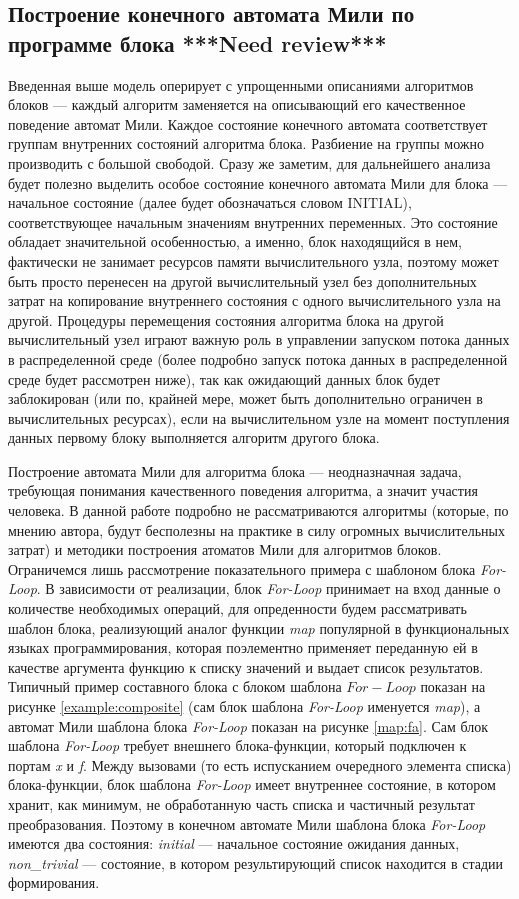 \documentclass[10pt,a4paper]{article}
\newcommand{\initial}{\text{INITIAL}}
\begin{document}
\subsection{Построение конечного автомата Мили по программе блока \textbf{***Need review***}}
Введенная выше модель оперирует с упрощенными описаниями алгоритмов блоков --- каждый алгоритм заменяется на описывающий его качественное поведение автомат Мили.
Каждое состояние конечного автомата соответствует группам внутренних состояний алгоритма блока. Разбиение на группы можно производить с большой свободой.
Сразу же заметим, для дальнейшего анализа будет полезно выделить особое состояние конечного автомата Мили для блока --- начальное состояние (далее будет обозначаться словом $\initial$), соответствующее начальным значениям внутренних переменных. Это состояние обладает значительной особенностью, а именно, блок находящийся в нем, фактически
не занимает ресурсов памяти вычислительного узла, поэтому может быть просто перенесен на другой вычислительный узел без дополнительных затрат
на копирование внутреннего состояния с одного вычислительного узла на другой. Процедуры перемещения состояния алгоритма блока на другой
вычислительный узел играют важную роль в управлении запуском потока данных в распределенной среде (более подробно запуск потока данных в распределенной среде будет рассмотрен ниже), так как ожидающий данных блок будет заблокирован (или по, крайней мере, может быть дополнительно ограничен в вычислительных ресурсах),
если на вычислительном узле на момент поступления данных первому блоку выполняется алгоритм другого блока.

Построение автомата Мили для алгоритма блока --- неодназначная задача, требующая понимания качественного поведения алгоритма, а значит участия человека. В данной работе подробно не рассматриваются алгоритмы (которые, по мнению автора, будут бесполезны на практике в силу огромных вычислительных затрат) и методики построения атоматов Мили для алгоритмов блоков. Ограничемся лишь рассмотрение показательного примера с шаблоном блока \textit{For-Loop}. В зависимости от реализации, блок \textit{For-Loop} принимает на вход данные о количестве необходимых операций, для опреденности будем рассматривать шаблон блока, реализующий аналог функции \textit{map} популярной в функциональных языках программирования,
которая поэлементно применяет переданную ей в качестве аргумента функцию к списку значений и выдает список результатов. Типичный пример составного блока с блоком шаблона $For-Loop$ показан на рисунке \ref{example:composite} (сам блок шаблона \textit{For-Loop} именуется \textit{map}), а автомат Мили шаблона блока \textit{For-Loop}
показан на рисунке \ref{map:fa}. Сам блок шаблона \textit{For-Loop} требует внешнего блока-функции, который подключен к портам \textit{x} и \textit{f}.
Между вызовами (то есть испусканием очередного элемента списка) блока-функции, блок шаблона \textit{For-Loop} имеет внутреннее состояние, в котором хранит, как минимум,
не обработанную часть списка и частичный результат преобразования. Поэтому в конечном автомате Мили шаблона блока \textit{For-Loop} имеются два состояния:
\textit{initial} --- начальное состояние ожидания данных, \textit{non\_trivial} --- состояние, в котором результирующий список находится в стадии формирования.
\end{document}
